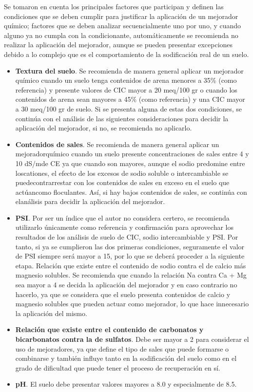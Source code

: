 Se tomaron en cuenta los principales factores que participan y definen las condiciones que se deben cumplir para justificar la aplicación de un mejorador químico; factores que se deben analizar secuencialmente uno por uno, y cuando alguno ya no cumpla con la condicionante, automáticamente se recomienda no realizar la aplicación del mejorador, aunque se pueden presentar excepciones debido a lo complejo que es el comportamiento de la sodificación real de un suelo.
\begin{itemize}
    \item \textbf{Textura del suelo}. Se recomienda de manera general aplicar un mejorador químico cuando un suelo tenga contenidos de arena menores a 35\% (como referencia) y presente valores de CIC mayor a 20 meq/100 gr o cuando los contenidos de arena sean mayores a 45\% (como referencia) y una CIC mayor a 30 meq/100 gr de suelo. Si se presenta alguna de estas dos condiciones, se continúa con el análisis de las siguientes consideraciones para decidir la aplicación del mejorador, si no, se recomienda no aplicarlo.
    \item \textbf{Contenidos de sales}. Se recomienda de manera general aplicar un mejoradorquímico cuando un suelo presente concentraciones de sales entre 4 y 10 dS/mde CE ya que cuando son mayores, aunque el sodio predomine entre loscationes, el efecto de los excesos de sodio soluble o intercambiable se puedecontrarrestar con los contenidos de sales en exceso en el suelo que actúancomo floculantes. Así, si hay bajos contenidos de sales, se continúa con elanálisis para decidir la aplicación del mejorador.
    \item \textbf{PSI}. Por ser un índice que el autor no considera certero, se recomienda utilizarlo únicamente como referencia y confirmación para aprovechar los resultados de los análisis de suelo de CIC, sodio intercambiable y PSI. Por tanto, si ya se cumplieron las dos primeras condiciones, seguramente el valor de PSI siempre será mayor a 15, por lo que se deberá proceder a la siguiente etapa. Relación que existe entre el contenido de sodio contra el de calcio más magnesio solubles. Se recomienda que cuando la relación Na contra Ca + Mg sea mayor a 4 se decida la aplicación del mejorador y en caso contrario no hacerlo, ya que se considera que el suelo presenta contenidos de calcio y magnesio solubles que pueden actuar como mejorador, lo que hace innecesario la aplicación del mismo.
    \item \textbf{Relación que existe entre el contenido de carbonatos y bicarbonatos contra la de sulfatos}. Debe ser mayor a 2 para considerar el uso de mejoradores, ya que define el tipo de sales que puede formarse o combinarse y también influye tanto en la sodificación del suelo como en el grado de dificultad que puede tener el proceso de recuperación en sí.
    \item \textbf{pH}. El suelo debe presentar valores mayores a 8.0 y especialmente de 8.5.    
\end{itemize}
